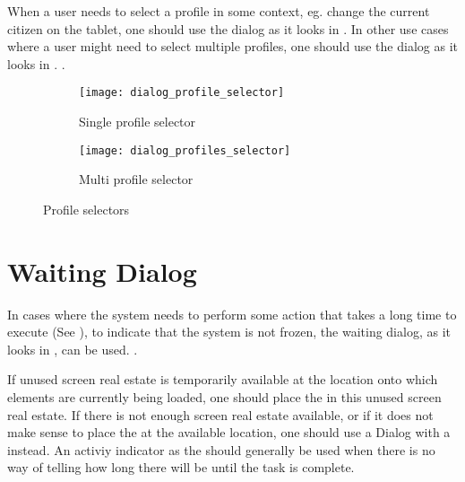 When a user needs to select a profile in some context, eg. change the current citizen on the tablet, one should use the dialog as it looks in . In other use cases where a user might need to select multiple profiles, one should use the dialog as it looks in . .

\begin{figure}[!htbp]
    \centering
    \begin{subfigure}[t]{0.4\textwidth}
    	\centering
        \texttt{[image: dialog\_profile\_selector]}
        \caption{Single profile selector}
        \label{fig:profile_selector_dialog}
    \end{subfigure}
    \hspace{5em}
    \begin{subfigure}[t]{0.4\textwidth}
    	\centering
        \texttt{[image: dialog\_profiles\_selector]}
        \caption{Multi profile selector}
        \label{fig:profiles_selector_dialog}
    \end{subfigure}
    
    \caption{Profile selectors}
    \label{fig:profile_selection}
\end{figure}

\section{Waiting Dialog}
\label{sec:waiting_dialog}

In cases where the system needs to perform some action that takes a long time to execute (See ), to indicate that the system is not frozen, the waiting dialog, as it looks in , can be used. .

\begin{note}
    If unused screen real estate is temporarily available at the location onto which elements are currently being loaded, one should place the  in this unused screen real estate. If there is not enough screen real estate available, or if it does not make sense to place the  at the available location, one should use a Dialog with a  instead. An activiy indicator as the  should generally be used when there is no way of telling how long there will be until the task is complete. 
\end{note}


